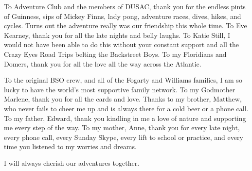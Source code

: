 {\small To Adventure Club and the members of DUSAC, thank you for the endless pints of Guinness, sips of Mickey Finns, lady pong, adventure races, dives, hikes, and cycles. Turns out the adventure really was our friendship this whole time. To Eve Kearney, thank you for all the late nights and belly laughs. To Katie Still, I would not have been able to do this without your constant support and all the Crazy Eyes Road Trips belting the Backstreet Boys. To my Floridians and Domers, thank you for all the love all the way across the Atlantic.}

{\small To the original BSO crew, and all of the Fogarty and Williams families, I am so lucky to have the world's most supportive family network. To my Godmother Marlene, thank you for all the cards and love. Thanks to my brother, Matthew, who never fails to cheer me up and is always there for a cold beer or a phone call. To my father, Edward, thank you kindling in me a love of nature and supporting me every step of the way. To my mother, Anne, thank you for every late night, every phone call, every Sunday Skype, every lift to school or practice, and every time you listened to my worries and dreams.} 

{\small I will always cherish our adventures together.}